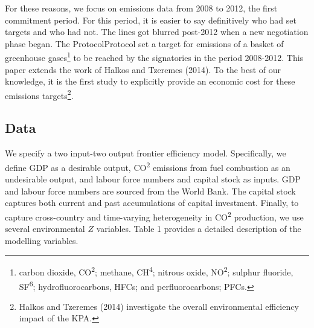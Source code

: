 \documentclass[
  10pt,
]{article}
\begin{document}
For these reasons, we focus on emissions data from 2008 to 2012, the
first commitment period. For this period, it is easier to say
definitively who had set targets and who had not. The lines got blurred
post-2012 when a new negotiation phase began. The ProtocolProtocol set a
target for emissions of a basket of greenhouse gases\footnote{carbon
  dioxide, CO\textsuperscript{2}; methane, CH\textsuperscript{4};
  nitrous oxide, NO\textsuperscript{2}; sulphur fluoride,
  SF\textsuperscript{6}; hydrofluorocarbons, HFCs; and perfluorocarbons;
  PFCs.} to be reached by the signatories in the period 2008-2012. This
paper extends the work of Halkos and Tzeremes (2014). To the best of our
knowledge, it is the first study to explicitly provide an economic cost
for these emissions targets\footnote{Halkos and Tzeremes (2014)
  investigate the overall environmental efficiency impact of the KPA.}.

\hypertarget{data}{%
\subsection{Data}\label{data}}

We specify a two input-two output frontier efficiency model.
Specifically, we define GDP as a desirable output, CO\textsuperscript{2}
emissions from fuel combustion as an undesirable output, and labour
force numbers and capital stock as inputs. GDP and labour force numbers
are sourced from the World Bank. The capital stock captures both current
and past accumulations of capital investment. Finally, to capture
cross-country and time-varying heterogeneity in CO\textsuperscript{2}
production, we use several environmental \(Z\) variables. Table 1
provides a detailed description of the modelling variables.

\begingroup\fontsize{8}{10}\selectfont
\end{document}
